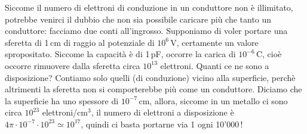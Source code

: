 Siccome il numero di elettroni di conduzione in un conduttore non \`e
illimitato, potrebbe venirci il dubbio che non sia possibile caricare pi\`u che
tanto un conduttore: facciamo due conti all'ingrosso. Supponiamo di voler
portare una sferetta di 1\,cm di raggio al potenziale di $10^6$\,V, certamente
un valore spropositato. Siccome la capacit\`a \`e di 1\,pF, occorre la carica di
$10^{-6}$\,C, cio\`e occorre rimuovere dalla sferetta circa $10^{13}$ elettroni.
Quanti ce ne sono a disposizione? Contiamo solo quelli (di conduzione) vicino
alla superficie, perch\`e altrimenti la sferetta non si comporterebbe pi\`u come
un conduttore. Diciamo che la superficie ha uno spessore di $10^{-7}$\,cm,
allora, siccome in un metallo ci sono circa $10^{23}$ elettroni/cm$^3$, il
numero di elettroni a disposizione \`e
\ $4\pi\cdot10^{-7}\cdot10^{23}\simeq10^{17}$, quindi ci basta portarne via 1
ogni 10'000\,!

